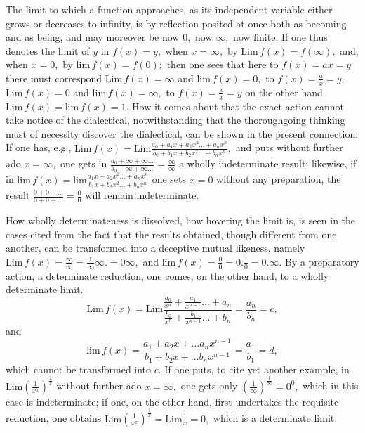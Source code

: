 \documentclass[12pt,a4paper,openany]{book}
\newcommand{\opage}[1]{\marginnote{\footnotesize\textit{[#1]}}}
\begin{document}
The limit to which a function approaches, as its independent variable either grows or decreases to infinity, is by reflection posited at once both as becoming and as being, and may moreover be now $0,$ now $\infty,$ now finite. If one thus denotes the limit of $y$ in $f(x)=y,$ when $x=\infty,$ by
\setcounter{footnote}{0}%
\opage{58}$\mathrm{Lim}\,f(x)=f(\infty),$ and, when $x=0,$ by $\mathrm{lim}\,f(x)=f(0);$ then one sees that here to $f(x)=ax=y$ there must correspond $\mathrm{Lim}\,f(x)=\infty$ and $\mathrm{lim}\,f(x)=0,$ to $f(x)=\frac{a}{x}=y,$
$\mathrm{Lim}\,f(x)=0$ and $\mathrm{lim}\,f(x)=\infty,$ to $f(x)=\frac{x}{x}=y$
on the other hand $\mathrm{Lim}\,f(x)=\mathrm{lim}\,f(x)=1.$ How it comes about that the exact action cannot take notice of the dialectical, notwithstanding that the thoroughgoing thinking must of necessity discover the dialectical, can be shown in the present connection. If one has, e.g., $\mathrm{Lim}\,f(x)=\mathrm{Lim}\frac{a_{0}+a_{1}x+a_{2}x^{2}\ldots+a_{n}x^{n}}{b_{0}+b_{1}x+b_{2}x^{2}\ldots+b_{n}x^{n}},$ and puts without further ado $x=\infty,$ one gets in $\frac{a_{0}+\infty+\infty\ldots}{b_{0}+\infty+\infty\ldots}=\frac{\infty}{\infty}$ a wholly indeterminate result; likewise, if in $\mathrm{lim}\,f(x)=\mathrm{lim}\frac{a_{1}x+a_{2}x^{2}\ldots+a_{n}x^{n}}{b_{1}x+b_{2}x^{2}\ldots+b_{n}x^{n}}$ one sets $x=0$ without any preparation, the result $\frac{0+0+\ldots}{0+0+\ldots}=\frac{0}{0}$ will remain indeterminate.

How wholly determinateness is dissolved, how hovering the limit is, is seen in the cases cited from the fact that the results obtained, though different from one another, can be transformed into a deceptive mutual likeness, namely $\mathrm{Lim}\,f(x)=\frac{\infty}{\infty}=\frac{1}{\infty}\infty.=0\infty,$ and $\mathrm{lim}\,f(x)=\frac{0}{0}=0.\frac{1}{0}=0.\infty.$ By a preparatory action, a determinate reduction, one comes, on the other hand, to a wholly determinate limit.
\[
\mathrm{Lim}\,f(x)=\mathrm{Lim}\frac{\frac{a_{0}}{x^{n}}+\frac{a_{1}}{x^{n-1}}\ldots+a_{n}}{\frac{b_{0}}{x^{n}}+\frac{b_{1}}{x^{n-1}}\ldots+b_{n}}=\frac{a_{n}}{b_{n}}=c,
\]
and
\setcounter{footnote}{0}%
\opage{59}\[
\mathrm{lim}\,f(x)=\frac{a_{1}+a_{2}x+\ldots a_{n}x^{n-1}}{b_{1}+b_{2}x+\ldots b_{n}x^{n-1}}=\frac{a_{1}}{b_{1}}=d,
\]
which cannot be transformed into $c.$ If one puts, to cite yet another example, in $\mathrm{Lim}\left(\frac{1}{x^{x}}\right)^{\frac{1}{x}}$ without further ado $x=\infty,$ one gets only $\left(\frac{1}{\infty}\right)^{\frac{1}{\infty}}=0^{0},$ which in this case is indeterminate; if one, on the other hand, first undertakes the requisite reduction, one obtains $\mathrm{Lim}\left(\frac{1}{x^{x}}\right)^{\frac{1}{x}}=\mathrm{Lim}\frac{1}{x}=0,$ which is a determinate limit.
\end{document}
